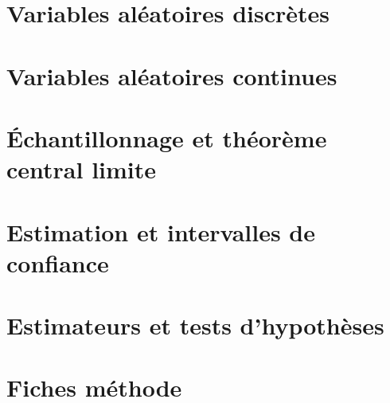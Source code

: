 \chapter{Variables aléatoires discrètes}


\chapter{Variables aléatoires continues}


\chapter{Échantillonnage et théorème central limite}


\chapter{Estimation et intervalles de confiance}


\chapter{Estimateurs et tests d'hypothèses}


\appendix
\chapter{Fiches méthode}



